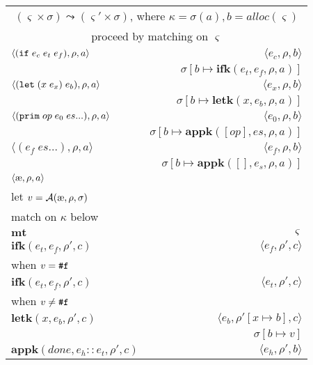 \documentclass[12pt,draft]{article}
\begin{document}
\begin{center}
\begin{tabular}{@{}l | r@{}}
\multicolumn{2}{c}{$(\varsigma \times \sigma) \leadsto (\varsigma' \times \sigma)$, 
where $\kappa = \sigma(a) , b = alloc(\varsigma) $} \\
\multicolumn{2}{c}{proceed by matching on $\varsigma$} \\
\hline\hline
$\langle
(\texttt{if}\;e_c\;e_t\;e_f) , \rho , a
\rangle$
&$\langle
e_c , \rho , b 
\rangle$ \\
& $\sigma[b \mapsto \textbf{ifk}(e_t , e_f , \rho , a)]$ \\
\hline
$\langle
(\texttt{let}\;(x\;e_x)\;e_b) , \rho , a
\rangle$
&$\langle
e_x , \rho , b
\rangle$ \\
& $\sigma[b \mapsto \textbf{letk}(x , e_b , \rho , a)]$ \\
\hline
$\langle
(\texttt{prim}\;op\;e_0\;es ...) , \rho , a
\rangle$
&$\langle
e_0 , \rho , b
\rangle$ \\
& $\sigma[b \mapsto \textbf{appk}([op] ,  es , \rho , a)]$ \\
\hline
$\langle
(e_f \; es ...) , \rho , a
\rangle$
&$\langle
e_f , \rho , b
\rangle$ \\
& $\sigma[b \mapsto \textbf{appk}([] , e_s , \rho , a)]$ \\
\hline
$\langle \mae , \rho , a \rangle$ & \\
let $v = \mathcal{A}(\mae, \rho, \sigma)$ \\
match on $\kappa$ below \\
\hline
$ \textbf{mt}$ & $\varsigma$ \\
\hline
$ \textbf{ifk}(e_t , e_f , \rho' , c) $ 
& $\langle e_f , \rho' , c \rangle$ \\
when $v = \texttt{\#f}$ & \\
\hline
$ \textbf{ifk}(e_t , e_f , \rho' , c) $ 
& $\langle e_t , \rho' , c \rangle$ \\
when $v \not= \texttt{\#f}$ & \\
\hline
$ \textbf{letk}(x , e_b , \rho' , c) $
& $\langle e_b , \rho'[x \mapsto b] , c \rangle$ \\
& $ \sigma[b \mapsto v] $ \\
\hline
$ \textbf{appk}(done, e_h::e_t , \rho' , c) $
& $\langle e_h , \rho' , b \rangle$ \\

\end{tabular}
\end{center}
\end{document}
